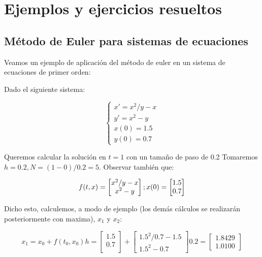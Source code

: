 \documentclass[12pt]{article}       %
\begin{document}
\section{Ejemplos y ejercicios resueltos}

\subsection{Método de Euler para sistemas de ecuaciones}

Veamos un ejemplo de aplicación del método de euler en un sistema de ecuaciones de primer orden:

Dado el siguiente sistema:

$$
\begin{cases}
x' = x^2/y - x\\
y' = x^2-y \\
x(0) = 1.5\\
y(0)=0.7
\end{cases}
$$

Queremos calcular la solución en $t=1$ con un tamaño de paso de 0.2
Tomaremos $h=0.2, N=(1-0)/0.2=5$.
Observar también que:

\begin{equation*}
f(t,x)=\begin{bmatrix}
 x^2/y-x \\
 x^2-y \\
\end{bmatrix};\\
x(0)=\begin{bmatrix}
1.5 \\
0.7
\end{bmatrix}
\end{equation*}
 
Dicho esto, calculemos, a modo de ejemplo (los demás cálculos se realizarán posteriormente con maxima), $x_1$ y $x_2$:

\begin{equation*}
x_1=x_0+f(t_0,x_0)h=\begin{bmatrix}
1.5\\
0.7\\
\end{bmatrix} + \begin{bmatrix}
1.5^2/0.7 - 1.5\\
1.5^2 - 0.7
\end{bmatrix}0.2=\begin{bmatrix}
1.8429\\
1.0100
\end{bmatrix}  
\end{equation*}
\end{document}
